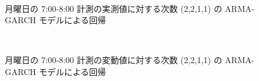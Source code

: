 \documentclass[technicalreport]{ieicej}
\begin{document}
\begin{figure}[tb]
\begin{center}
\\
\caption{月曜日の 7:00-8:00 計測の実測値に対する次数 (2,2,1,1) の ARMA-GARCH モデルによる回帰}
\label{norm-reg}
\end{center}
\end{figure}

\begin{figure}[tb]
\begin{center}
\\
\caption{月曜日の 7:00-8:00 計測の変動値に対する次数 (2,2,1,1) の ARMA-GARCH モデルによる回帰}
\label{diff-reg}
\end{center}
\end{figure}
\end{document}
